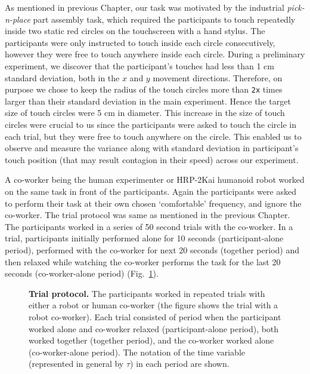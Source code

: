 As mentioned in previous Chapter, our task was motivated by the industrial \textit{pick-n-place} part assembly task, which required the participants to touch repeatedly inside two static red circles on the touchscreen with a hand stylus. The participants were only instructed to touch inside each circle consecutively, however they were free to touch anywhere inside each circle. During a preliminary experiment, we discover that the participant's touches had less than 1 cm standard deviation, both in the $x$ and $y$ movement directions. Therefore, on purpose we chose to keep the radius of the touch circles more than \texttt{2x} times larger than their standard deviation in the main experiment. Hence the target size of touch circles were 5 cm in diameter. This increase in the size of touch circles were crucial to us since the participants were asked to touch the circle in each trial, but they were free to touch anywhere on the circle. This enabled us to observe and measure the variance along with standard deviation in participant's touch position (that may result contagion in their speed) across our experiment.
 
A co-worker being the human experimenter or HRP-2Kai humanoid robot worked on the same task in front of the participants. Again the participants were asked to perform their task at their own chosen `comfortable' frequency, and ignore the co-worker. The trial protocol was same as mentioned in the previous Chapter. The participants worked in a series of 50 second trials with the co-worker. In a trial, participants initially performed alone for 10 seconds (participant-alone period), performed with the co-worker for next 20 seconds (together period) and then relaxed while watching the co-worker performs the task for the last 20 seconds (co-worker-alone period) (Fig.~\ref{fig:trialprotocol2}).   

\begin{figure}[hpt]
	\caption{{\bf Trial protocol.} The participants worked in repeated trials with either a robot or human co-worker (the figure shows the trial with a robot co-worker). Each trial consisted of period when the participant worked alone and co-worker relaxed (participant-alone period), both worked together (together period), and the co-worker worked alone (co-worker-alone period). The notation of the time variable (represented in general by $\tau$) in each period are shown.}
	\label{fig:trialprotocol2}
\end{figure}

